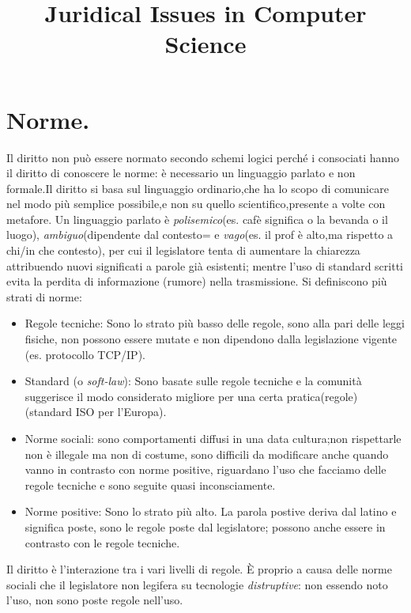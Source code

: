 \documentclass[a4page, 11pt, twocolumn]{article}
\title{Juridical Issues in Computer Science}
\date{}
\begin{document}
\maketitle

\section{Norme.}
Il diritto non può essere normato secondo schemi logici perché i consociati hanno il diritto di conoscere le norme: è necessario un linguaggio parlato e non formale.Il diritto si basa sul linguaggio ordinario,che ha lo scopo di comunicare nel modo più semplice possibile,e non su quello scientifico,presente a volte con metafore.
Un linguaggio parlato è \textit{polisemico}(es. cafè significa o la bevanda o il luogo), \textit{ambiguo}(dipendente dal contesto= e \textit{vago}(es. il prof è alto,ma rispetto a chi/in che contesto), per cui il legislatore tenta di aumentare la chiarezza attribuendo nuovi significati a parole già esistenti; mentre l'uso di standard scritti evita la perdita di informazione (rumore) nella trasmissione. \newline
Si definiscono più strati di norme:
\begin{itemize}
\item Regole tecniche: Sono lo strato più basso delle regole, sono alla pari delle leggi fisiche, non possono essere mutate e non dipendono dalla legislazione vigente (es. protocollo TCP/IP). 
\item Standard (o \textit{soft-law}): Sono basate sulle regole tecniche e la comunità suggerisce il modo considerato migliore per una certa pratica(regole) (standard ISO per l'Europa).
\item Norme sociali: sono comportamenti diffusi in una data cultura;non rispettarle non è illegale ma non di costume, sono difficili da modificare anche quando vanno in contrasto con norme positive, riguardano l'uso che facciamo delle regole tecniche e sono seguite quasi inconsciamente.
\item Norme positive: Sono lo strato più alto. La parola postive deriva dal latino e significa poste, sono le regole poste dal legislatore; possono anche essere in contrasto con le regole tecniche.
\end{itemize}
Il diritto è l'interazione tra i vari livelli di regole. \newline
È proprio a causa delle norme sociali che il legislatore non legifera su tecnologie \textit{distruptive}: non essendo noto l'uso, non sono poste regole nell'uso.
\end{document}
